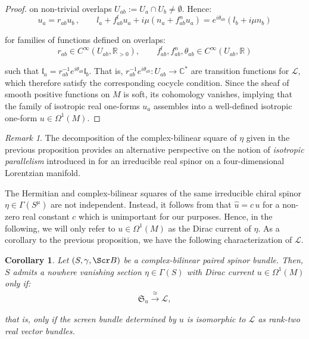 \documentclass[10pt,a4paper,twoside,reqno]{amsart}
\theoremstyle{plain}
\newtheorem{cor}[thm]{Corollary}
\theoremstyle{definition}
\theoremstyle{remark}
\newtheorem{remark}[thm]{Remark}
\def\scB{\Scr B}
\def\cL{\mathcal{L}}
\begin{document}
\begin{proof}
\noindent
on non-trivial overlaps $U_{ab}:=U_a\cap U_b \neq \emptyset$. Hence:
\begin{equation}
\label{eq:transitionL}
u_a = r_{ab} u_b\, , \qquad l_a + f^l_{ab} u_a + i \mu (n_a + f^n_{ab} u_a) = e^{i\theta_{ab}} (l_b + i \mu n_b)
\end{equation}

\noindent
for families of functions defined on overlaps:
\begin{equation*}
r_{ab}\in C^{\infty}(U_{ab}, \mathbb{R}_{>0}),\qquad f^l_{ab},f^n_{ab},\theta_{ab}\in C^{\infty}(U_{ab}, \mathbb{R})
\end{equation*}

\noindent
such that $\mathfrak{l}_{a} = r^{-1}_{ab} e^{i\theta_{ab}} \mathfrak{l}_b$. That is, $r^{-1}_{ab} e^{i\theta_{ab}}\colon U_{ab} \to \mathbb{C}^{\ast}$ are transition functions for $\cL$, which therefore satisfy the corresponding cocycle condition. Since the sheaf of smooth positive functions on $M$ is soft, its cohomology vanishes, implying that the family of isotropic real one-forms $u_a$ assembles into a well-defined isotropic one-form $u\in\Omega^1(M)$.  
\end{proof}

\begin{remark}
The decomposition of the complex-bilinear square of $\eta$ given in the previous proposition provides an alternative perspective on the notion of \emph{isotropic parallelism} introduced in \cite{ShahbaziThesis} for an irreducible real spinor on a four-dimensional Lorentzian manifold.
\end{remark}

\noindent
The Hermitian and complex-bilinear squares of the same irreducible chiral spinor $\eta\in \Gamma(S^{\mu})$ are not independent. Instead, it follows from \cite[Prop.\ 3.30]{Algebraic_Complex_Square_2025} that $\widehat{u} = c\, u$ for a non-zero real constant $c$ which is unimportant for our purposes. Hence, in the following, we will only refer to $u\in \Omega^1(M)$ as the Dirac current of $\eta$. As a corollary to the previous proposition, we have the following characterization of $\cL$.

\begin{cor}
Let $(S,\gamma,\scB)$ be a complex-bilinear paired spinor bundle. Then, $S$ admits a nowhere vanishing section $\eta\in \Gamma(S)$ with Dirac current $u\in \Omega^1(M)$ only if:
\begin{eqnarray*}
\mathfrak{S}_u \xrightarrow{\cong} \cL,
\end{eqnarray*}

\noindent
that is, only if the screen bundle determined by $u$ is isomorphic to $\cL$ as rank-two real vector bundles. 
\end{cor}
\end{document}
